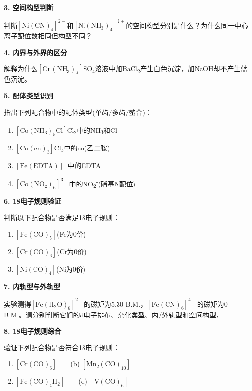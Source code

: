 \textbf{3. 空间构型判断}

判断\(\mathrm{[Ni(CN)_4]^{2-}}\)和\(\mathrm{[Ni(NH_3)_4]^{2+}}\)的空间构型分别是什么？为什么同一中心离子配位数相同但构型不同？

\textbf{4. 内界与外界的区分}

解释为什么\(\mathrm{[Cu(NH_3)_4]SO_4}\)溶液中加BaCl\textsubscript{2}产生白色沉淀，加NaOH却不产生蓝色沉淀。

\textbf{5. 配体类型识别}

指出下列配合物中的配体类型(单齿/多齿/螯合)：

\begin{enumerate}
\def\labelenumi{(\alph{enumi})}
\tightlist
\item
  \(\mathrm{[Co(NH_3)_5Cl]Cl_2}\)中的NH\textsubscript{3}和Cl\textsuperscript{-}
\item
  \(\mathrm{[Co(en)_3]Cl_3}\)中的en(乙二胺)
\item
  \(\mathrm{[Fe(EDTA)]^-}\)中的EDTA
\item
  \(\mathrm{[Co(NO_2)_6]^{3-}}\)中的NO\textsubscript{2}\textsuperscript{-}(硝基N配位)
\end{enumerate}

\textbf{6. 18电子规则验证}

判断以下配合物是否满足18电子规则：

\begin{enumerate}
\def\labelenumi{(\alph{enumi})}
\tightlist
\item
  \(\mathrm{[Fe(CO)_5]}\)(Fe为0价)
\item
  \(\mathrm{[Cr(CO)_6]}\)(Cr为0价)
\item
  \(\mathrm{[Ni(CO)_4]}\)(Ni为0价)
\end{enumerate}

\textbf{7. 内轨型与外轨型}

实验测得\(\mathrm{[Fe(H_2O)_6]^{2+}}\)的磁矩为5.30 B.M.，\(\mathrm{[Fe(CN)_6]^{4-}}\)的磁矩为0 B.M.。请分别判断它们的d电子排布、杂化类型、内/外轨型和空间构型。

\textbf{8. 18电子规则综合}

验证下列配合物是否符合18电子规则：

\begin{enumerate}
\def\labelenumi{(\alph{enumi})}
\tightlist
\item
  \(\mathrm{[Cr(CO)_6]}\)　　(b) \(\mathrm{[Mn_2(CO)_{10}]}\)
\item
  \(\mathrm{[Fe(CO)_4H_2]}\)　　(d) \(\mathrm{[V(CO)_6]}\)
\end{enumerate}


